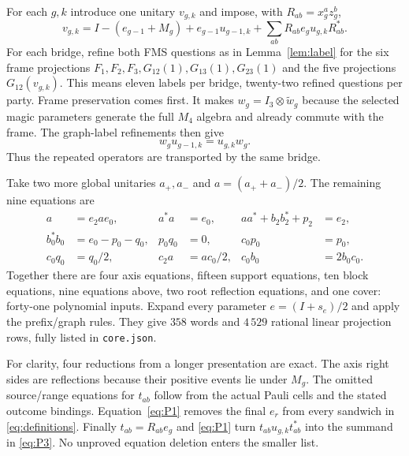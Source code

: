 For each $g,k$ introduce one unitary $v_{g,k}$ and impose, with $R_{ab}=x_g^az_g^b$,
\begin{equation}\label{eq:P3}
 v_{g,k}=I-(e_{g-1}+M_g)+e_{g-1}u_{g-1,k}
                 +\sum_{ab}R_{ab}e_gu_{g,k}R_{ab}^*.
\end{equation}
For each bridge, refine both FMS questions as in Lemma~\ref{lem:label} for the six frame projections $F_1,F_2,F_3,G_{12}(1),G_{13}(1),G_{23}(1)$ and the five projections $G_{12}(v_{g,k})$. This means eleven labels per bridge, twenty-two refined questions per party. Frame preservation comes first. It makes $w_g=I_3\otimes\widetilde w_g$ because the selected magic parameters generate the full $M_4$ algebra and already commute with the frame. The graph-label refinements then give
\begin{equation}\label{eq:transport}
 w_gu_{g-1,k}=u_{g,k}w_g.
\end{equation}
Thus the repeated operators are transported by the same bridge.

Take two more global unitaries $a_+,a_-$ and $a=(a_++a_-)/2$. The remaining nine equations are
\begin{align}
 a&=e_2ae_0,&a^*a&=e_0,&aa^*+b_2b_2^*+p_2&=e_2,\label{eq:P5a}\\
 b_0^*b_0&=e_0-p_0-q_0,&p_0q_0&=0,&c_0p_0&=p_0,\label{eq:P5b}\\
 c_0q_0&=q_0/2,&c_2a&=ac_0/2,&c_0b_0&=2b_0c_0.\label{eq:P5c}
\end{align}
Together there are four axis equations, fifteen support equations, ten block equations, nine equations above, two root reflection equations, and one cover: forty-one polynomial inputs. Expand every parameter $e=(I+s_e)/2$ and apply the prefix/graph rules. They give $358$ words and $4\,529$ rational linear projection rows, fully listed in \texttt{core.json}.

For clarity, four reductions from a longer presentation are exact. The axis right sides are reflections because their positive events lie under $M_g$. The omitted source/range equations for $t_{ab}$ follow from the actual Pauli cells and the stated outcome bindings. Equation~\eqref{eq:P1} removes the final $e_r$ from every sandwich in \eqref{eq:definitions}. Finally $t_{ab}=R_{ab}e_g$ and \eqref{eq:P1} turn $t_{ab}u_{g,k}t_{ab}^*$ into the summand in \eqref{eq:P3}. No unproved equation deletion enters the smaller list.

